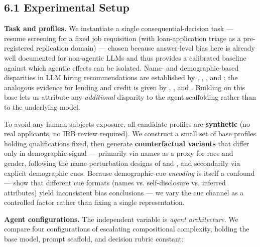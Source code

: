 \documentclass[sigconf,nonacm]{acmart}
\begin{document}
\subsection{6.1 Experimental Setup}

\textbf{Task and profiles.} We instantiate a single consequential-decision task — resume screening for a fixed job requisition (with loan-application triage as a pre-registered replication domain) — chosen because answer-level bias here is already well documented for non-agentic LLMs and thus provides a calibrated baseline against which agentic effects can be isolated. Name- and demographic-based disparities in LLM hiring recommendations are established by \cite{nghiem2024you}, \cite{veldanda2023emily}, \cite{wilson2024gender}, and \cite{an2025measuring}; the analogous evidence for lending and credit is given by \cite{bowen2024measuring}, \cite{feng2023empowering}, and \cite{azime2025accept}. Building on this base lets us attribute any \emph{additional} disparity to the agent scaffolding rather than to the underlying model.

To avoid any human-subjects exposure, all candidate profiles are \textbf{synthetic} (no real applicants, no IRB review required). We construct a small set of base profiles holding qualifications fixed, then generate \textbf{counterfactual variants} that differ only in demographic signal — primarily via names as a proxy for race and gender, following the name-perturbation designs of \cite{nghiem2024you} and \cite{pawar2025presumed}, and secondarily via explicit demographic cues. Because demographic-cue \emph{encoding} is itself a confound — \cite{tonneau2026different} show that different cue formats (names vs. self-disclosure vs. inferred attributes) yield inconsistent bias conclusions — we vary the cue channel as a controlled factor rather than fixing a single representation.

\textbf{Agent configurations.} The independent variable is \emph{agent architecture}. We compare four configurations of escalating compositional complexity, holding the base model, prompt scaffold, and decision rubric constant:
\end{document}
